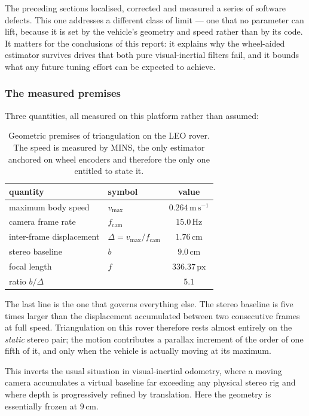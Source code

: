 The preceding sections localised, corrected and measured a series of software
defects. This one addresses a different class of limit --- one that no
parameter can lift, because it is set by the vehicle's geometry and speed
rather than by its code. It matters for the conclusions of this report: it
explains why the wheel-aided estimator survives drives that both pure
visual-inertial filters fail, and it bounds what any future tuning effort can
be expected to achieve.

\subsubsection{The measured premises}

Three quantities, all measured on this platform rather than assumed:

\begin{table}[htbp]
\centering
\caption{Geometric premises of triangulation on the LEO rover. The speed is
measured by MINS, the only estimator anchored on wheel encoders and therefore
the only one entitled to state it.}
\label{tab:premisses}
\begin{tabular}{llc}
\hline
quantity & symbol & value \\
\hline
maximum body speed        & $v_{\max}$      & $0.264\,\mathrm{m\,s^{-1}}$ \\
camera frame rate         & $f_{\mathrm{cam}}$ & $15.0\,\mathrm{Hz}$ \\
inter-frame displacement  & $\Delta = v_{\max}/f_{\mathrm{cam}}$ & $\mathbf{1.76\,\mathrm{cm}}$ \\
stereo baseline           & $b$             & $\mathbf{9.0\,\mathrm{cm}}$ \\
focal length              & $f$             & $336.37\,\mathrm{px}$ \\
\hline
ratio $b/\Delta$          &                 & $\mathbf{5.1}$ \\
\hline
\end{tabular}
\end{table}

The last line is the one that governs everything else. The stereo baseline is
five times larger than the displacement accumulated between two consecutive
frames at full speed. Triangulation on this rover therefore rests almost
entirely on the \emph{static} stereo pair; the motion contributes a parallax
increment of the order of one fifth of it, and only when the vehicle is
actually moving at its maximum.

This inverts the usual situation in visual-inertial odometry, where a moving
camera accumulates a virtual baseline far exceeding any physical stereo rig
and where depth is progressively refined by translation. Here the geometry is
essentially frozen at $9\,\mathrm{cm}$.

